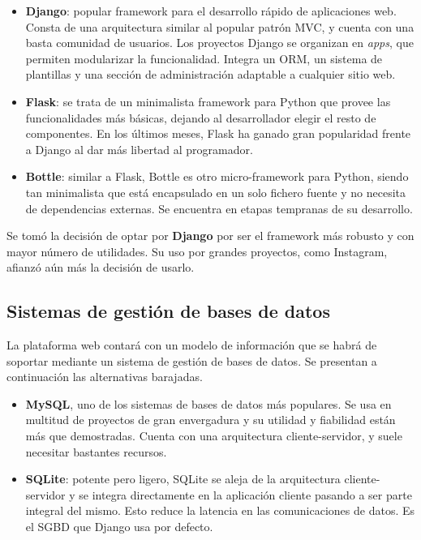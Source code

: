 \begin{itemize}
\item \textbf{Django}\cite{django}: popular framework para el desarrollo rápido
  de aplicaciones web. Consta de una arquitectura similar al popular patrón
  \ac{MVC}, y cuenta con una basta comunidad de usuarios. Los proyectos Django
  se organizan en \textit{apps}, que permiten modularizar la
  funcionalidad. Integra un \ac{ORM}, un sistema de plantillas y una sección de
  administración adaptable a cualquier sitio web.

\item \textbf{Flask}\cite{flask}: se trata de un minimalista framework para Python que
  provee las funcionalidades más básicas, dejando al desarrollador elegir el
  resto de componentes. En los últimos meses, Flask ha ganado gran popularidad
  frente a Django al dar más libertad al programador.

\item \textbf{Bottle}\cite{bottle}: similar a Flask, Bottle es otro
  micro-framework para Python, siendo tan minimalista que está encapsulado en un
  solo fichero fuente y no necesita de dependencias externas. Se encuentra en
  etapas tempranas de su desarrollo.

\end{itemize}

Se tomó la decisión de optar por \textbf{Django} por ser el framework más
robusto y con mayor número de utilidades. Su uso por grandes proyectos, como
Instagram, afianzó aún más la decisión de usarlo.

\subsection{Sistemas de gestión de bases de datos}

La plataforma web contará con un modelo de información que se habrá de soportar
mediante un sistema de gestión de bases de datos. Se presentan a continuación
las alternativas barajadas.

\begin{itemize}
\item \textbf{MySQL}\cite{mysql}, uno de los sistemas de bases de datos más populares. Se
  usa en multitud de proyectos de gran envergadura y su utilidad y fiabilidad
  están más que demostradas. Cuenta con una arquitectura cliente-servidor, y
  suele necesitar bastantes recursos.

\item \textbf{SQLite}\cite{sqlite}: potente pero ligero, SQLite se aleja de la arquitectura
  cliente-servidor y se integra directamente en la aplicación cliente pasando a
  ser parte integral del mismo. Esto reduce la latencia en las comunicaciones de
  datos. Es el SGBD que Django usa por defecto.

\end{itemize}

